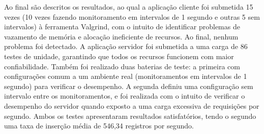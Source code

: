 Ao final são descritos os resultados, ao qual a aplicação cliente foi submetida 15 vezes (10 vezes fazendo monitoramento em intervalos de 1 segundo e outras 5 sem intervalos) à ferramenta Valgrind, com o intuito de identificar problemas de vazamento de memória e alocação ineficiente de recursos. Ao final, nenhum problema foi detectado. A aplicação servidor foi submetida a uma carga de 86 testes de unidade, garantindo que todos os recursos funcionem com maior confiabilidade. Também foi realizado duas baterias de teste: a primeira com configurações comum a um ambiente real (monitoramentos em intervalos de 1 segundo) para verificar o desempenho. A segunda definiu uma configuração sem intervalo entre os monitoramentos, e foi realizada com o intuito de verificar o desempenho do servidor quando exposto a uma carga excessiva de requisições por segundo. Ambos os testes apresentaram resultados satisfatórios, tendo o segundo uma taxa de inserção média de 546,34 registros por segundo.
